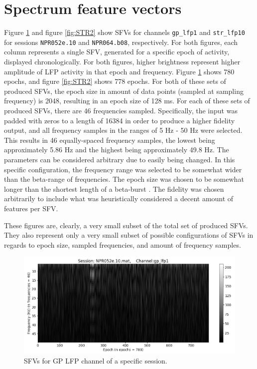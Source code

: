\documentclass{kththesis}
\begin{document}
\section{Spectrum feature vectors}\label{SFV Results}

Figure \ref{fig:GP1} and figure \ref{fig:STR2} show SFVs for channels \texttt{gp\_lfp1} and \texttt{str\_lfp10} for sessions \texttt{NPR052e.10} and \texttt{NPR064.b08}, respectively. 
For both figures, each column represents a single SFV, generated for a specific epoch of activity, displayed chronologically. 
For both figures, higher brightness represent higher amplitude of LFP activity in that epoch and frequency.
Figure \ref{fig:GP1} shows 780 epochs, and figure \ref{fig:STR2} shows 778 epochs. 
For both of these sets of produced SFVs, the epoch size in amount of data points (sampled at sampling frequency) is 2048, resulting in an epoch size of 128 ms. 
For each of these sets of produced SFVs, there are 46 frequencies sampled. 
Specifically, the input was padded with zeros to a length of 16384 in order to produce a higher fidelity output, and all frequency samples in the ranges of 5 Hz - 50 Hz were selected. 
This results in 46 equally-spaced frequency samples, the lowest being approximately 5.86 Hz and the highest being approximately 49.8 Hz. 
The parameters can be considered arbitrary due to easily being changed.
In this specific configuration, the frequency range was selected to be somewhat wider than the beta-range of frequencies.
The epoch size was chosen to be somewhat longer than the shortest length of a beta-burst \parencite{Cagnan}.
The fidelity was chosen arbitrarily to include what was heuristically considered a decent amount of features per SFV.

These figures are, clearly, a very small subset of the total set of produced SFVs. They also represent only a very small subset of possible configurations of SFVs in regards to epoch size, sampled frequencies, and amount of frequency samples.

\begin{figure}[H]
    \centering
    \centerline{\includegraphics[width=1.1\textwidth]{images/GP1.png}}
    \caption{SFVs for GP LFP channel of a specific session.}
    \label{fig:GP1}
\end{figure}
\end{document}
